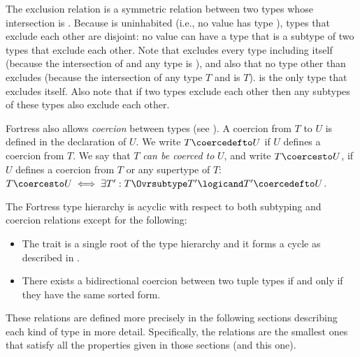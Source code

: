 The exclusion relation is a symmetric relation between two types
whose intersection is .
Because  is uninhabited
(i.e., no value has type ),
types that exclude each other are disjoint:
no value can have a type that is a subtype of two types that exclude each other.
Note that  excludes every type including itself
(because the intersection of  and any type is ),
and also that no type other than  excludes 
(because the intersection of any type $T$ and  is $T$).
 is the only type that excludes itself.
Also note that if two types exclude each other
then any subtypes of these types also exclude each other.


Fortress also allows \emph{coercion} between types
(see ).  A coercion from $T$ to $U$
is defined in the declaration of $U$.  We write $T \coercedefto U$ if
$U$ defines a coercion from $T$.  We say that $T$ \emph{can be coerced
to} $U$, and write $T \coercesto U$, if $U$ defines a coercion from
$T$ or any supertype of $T$: $T \coercesto U \iff \exists T':
T \Ovrsubtype T' \logicand T' \coercedefto U$.


The Fortress type hierarchy is acyclic with respect to both subtyping and
coercion relations except for the following:
\begin{itemize}
\item The trait  is a single root of the type hierarchy and it
forms a cycle as described in .
\item There exists a bidirectional coercion between two tuple types if and
  only if they have the same sorted form.
\end{itemize}

These relations are defined more precisely
in the following sections describing each kind of type in more detail.
Specifically,
the relations are the smallest ones that satisfy
all the properties given in those sections (and this one).


